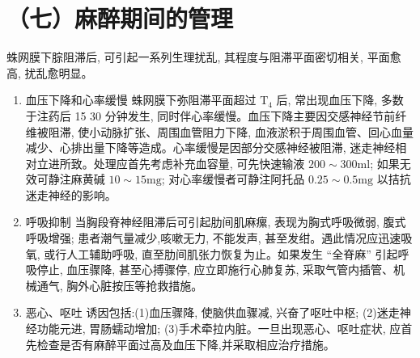 \documentclass[10pt]{article}
\begin{document}
\section*{（七）麻醉期间的管理}
蛛网膜下腙阻滞后, 可引起一系列生理扰乱, 其程度与阻滞平面密切相关, 平面愈高, 扰乱愈明显。

\begin{enumerate}
  \item 血压下降和心率缓慢 蛛网膜下弥阻滞平面超过 $\mathrm{T}_{4}$ 后, 常出现血压下降, 多数于注药后 15 30 分钟发生, 同时伴心率缓慢。血压下降主要因交感神经节前纤维被阻滞, 使小动脉扩张、周围血管阻力下降, 血液淤积于周围血管、回心血量减少、心排出量下降等造成。心率缓慢是因部分交感神经被阻滞, 迷走神经相对立进所致。处理应首先考虑补充血容量, 可先快速输液 $200 \sim 300 \mathrm{ml}$; 如果无效可静注麻黄碱 $10 \sim 15 \mathrm{mg}$; 对心率缓慢者可静注阿托品 $0.25 \sim 0.5 \mathrm{mg}$ 以拮抗迷走神经的影响。

  \item 呼吸抑制 当胸段脊神经阻滞后可引起肋间肌麻瘰, 表现为胸式呼吸微弱, 腹式呼吸增强; 患者潮气量减少,咳嗽无力, 不能发声, 甚至发绀。遇此情况应迅速吸氧, 或行人工辅助呼吸, 直至肋间肌张力恢复为止。如果发生 “全脊麻” 引起呼吸停止, 血压骤降, 甚至心搏骤停, 应立即施行心肺复苏, 采取气管内插管、机械通气, 胸外心脏按压等抢救措施。

  \item 恶心、呕吐 诱因包括:(1)血压骤降, 使脑供血骤减, 兴奋了呕吐中枢; (2)迷走神经功能元进, 胃肠蠕动增加; (3)手术牵拉内脏。一旦出现恶心、呕吐症状, 应首先检查是否有麻醉平面过高及血压下降,并采取相应治疗措施。

\end{enumerate}
\end{document}
